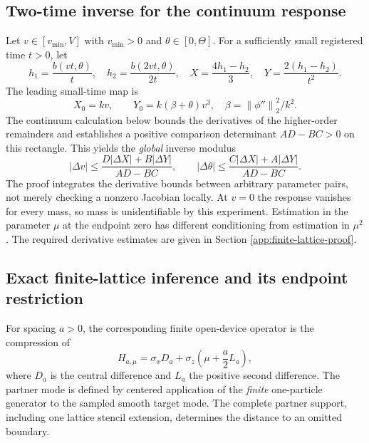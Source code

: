 \documentclass[11pt]{article}
\newcommand{\norm}[1]{\left\|#1\right\|}
\theoremstyle{definition}
\begin{document}
\subsection{Two-time inverse for the continuum response}
Let $v\in[v_{\min},V]$ with $v_{\min}>0$ and
$\theta\in[0,\Theta]$. For a sufficiently small registered time $t>0$,
let
\[
 h_1=\frac{b(vt,\theta)}t,\quad
 h_2=\frac{b(2vt,\theta)}{2t},\quad
 X=\frac{4h_1-h_2}{3},\quad
 Y=\frac{2(h_1-h_2)}{t^2}.
\]
The leading small-time map is
\[
 X_0=kv,\qquad Y_0=k(\beta+\theta)v^3,
 \quad\beta=\norm{\phi''}_2^2/k^2.
\]
The continuum calculation below bounds the derivatives of the
higher-order remainders and establishes a positive comparison determinant
$AD-BC>0$ on this rectangle. This yields the \emph{global} inverse modulus
\begin{equation}
 |\Delta v|\le\frac{D|\Delta X|+B|\Delta Y|}{AD-BC},\qquad
 |\Delta\theta|\le\frac{C|\Delta X|+A|\Delta Y|}{AD-BC}.
 \label{eq:twotime-continuum-inverse}
\end{equation}
The proof integrates the derivative bounds between arbitrary parameter
pairs, not merely checking a nonzero Jacobian locally. At $v=0$ the
response vanishes for every mass, so mass is unidentifiable by this
experiment. Estimation in the parameter $\mu$ at the endpoint zero has
different conditioning from estimation in $\mu^2$. The required derivative estimates are given in Section \ref{app:finite-lattice-proof}.

\subsection{Exact finite-lattice inference and its endpoint restriction}
For spacing $a>0$, the corresponding finite open-device operator is the
compression of
\begin{equation}
 H_{a,\mu}=\sigma_x D_a+\sigma_z\left(\mu+\frac a2L_a\right),
 \label{eq:twotime-lattice-dirac}
\end{equation}
where $D_a$ is the central difference and $L_a$ the positive second
difference. The partner mode is defined by centered application of the
\emph{finite} one-particle generator to the sampled smooth target mode.
The complete partner support, including one lattice stencil extension,
determines the distance to an omitted boundary.
\end{document}
